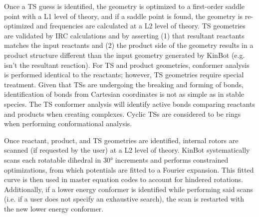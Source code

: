 \documentclass[preprint, 11pt]{elsarticle} %
\begin{document}
Once a TS guess is identified, the geometry is optimized to a first-order saddle point with a L1 level of theory, and if a saddle point is found, the geometry is re-optimized and frequencies are calculated at a L2 level of theory.
TS geometries are validated by IRC calculations and by asserting (1) that resultant reactants matches the input reactants and (2) the product side of the geometry results in a product structure different than the input geometry generated by KinBot (e.g.  isn't the resultant reaction).
For TS and product geometries, conformer analysis is performed identical to the reactants; however, TS geometries require special treatment. 
Given that TSs are undergoing the breaking and forming of bonds, identification of bonds from Cartesian coordinates is not as simple as in stable species.
The TS conformer analysis will identify active bonds comparing reactants and products when creating complexes. 
Cyclic TSs are considered to be rings when performing conformational analysis.

Once reactant, product, and TS geometries are identified, internal rotors are scanned (if requested by the user) at a L2 level of theory.
KinBot systematically scans each rotatable dihedral in \ang{30} increments and performs constrained optimizations, from which potentials are fitted to a Fourier expansion.
This fitted curve is then used in master equation codes to account for hindered rotations.
Additionally, if a lower energy conformer is identified while performing said scans (i.e. if a user does not specify an exhaustive search), the scan is restarted with the new lower energy conformer.

\end{document}
